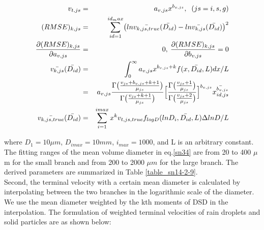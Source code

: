 \begin{eqnarray}
v_{t,js}&=&a_{v,js}x^{b_{v,js}},\;\;(js=i,s,g)\label{sn33}\\
(RMSE)_{k,js}&=&\sum_{id=1}^{id_max}\bigl(ln\bar{v_{k,js,true}}(\bar{D_{id}})-ln\bar{v_{k,js}}(\bar{D_{id}})\bigr)^{2}\label{sn34}\\
\frac{\partial(RMSE)_{k,js}}{\partial a_{v,js}}&=&0,\:\frac{\partial (RMSE)_{k,js}}{\partial b_{v,js}}=0\nonumber\\
\bar{v_{k,js}}(\bar{D_{id}})&=&\int_{0}^{\infty}a_{v,js}x^{b_{v,js}+k}f(x,\bar{D_{id}},L)dx/L\nonumber\\
&=&a_{v,js}\frac{\Gamma\bigl(\frac{v_{js}+b_{v,js}+k+1}{\mu_{js}}\bigr)}{\Gamma\bigl(\frac{v_{js}+k+1}{\mu_{js}}\bigr)}
\Bigl[\frac{\Gamma\bigl(\frac{v_{js}+1}{\mu_{js}}\bigr)}{\Gamma\bigl(\frac{v_{js}+2}{\mu_{js}}\bigr)}\Bigr]^{b_{v,js}}\bar{x_{id,js}^{b_{v,js}}}\label{sn35}\\
\bar{v_{k,js,true}}(\bar{D_{id}})&=&\sum_{i=1}^{imax}x^{k}v_{t,js,true}f_{logD}(lnD_{i},\bar{D_{id}},L)\Delta ln D/L\nonumber
\end{eqnarray}

where $D_{1}=10\mu m$, $D_{imax}=10mm$, $i_{max}=1000$, and L is an arbitrary constant. The fitting ranges of the mean volume diameter in eq.\ref{sn34} are from 20 to 400 $\mu$m for the small branch and from 200 to 2000 $\mu m$ for the large branch. The derived parameters are summarized in Table \ref{table_sn14-2-9}.\\
Second, the terminal velocity with a certain mean diameter is calculated by interpolating between the two branches in the logarithmic scale of the diameter. We use the mean diameter weighted by the kth moments of DSD in the interpolation. The formulation of weighted terminal velocities of rain droplets and solid particles are as shown below:

